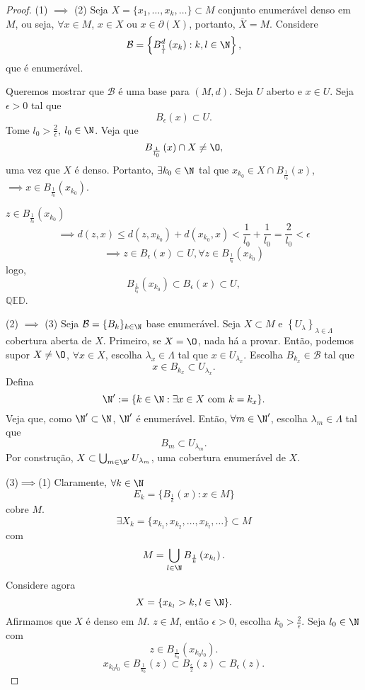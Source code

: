 \begin{proof}
    (1) $\implies$ (2)
    Seja $X=\{x_1,\ldots,x_k,\ldots\} \subset M$ conjunto enumerável denso em $M$, ou seja, $\forall x \in M$, $x\in X$ ou $x \in \partial\left( X \right)$, portanto, $\overline{X}=M$. Considere \[
    \mathcal{B} = \left\{ B_{\frac{1}{l}}^{d}\left( x_k \right) : k,l\in \N \right\} 
    ,\] que é enumerável.

    Queremos mostrar que $\mathcal{B}$ é uma base para $\left( M,d \right) $. Seja $U$ aberto e $x\in U$. Seja $\epsilon>0$ tal que \[
    B_{\epsilon}\left( x \right) \subset U
    .\] Tome $l_0>\frac{2}{\epsilon}$, $l_0\in \N$. Veja que \[
    B_{\frac{1}{l_0}}\left( x \right) \cap X \neq \O
    ,\] uma vez que $X$ é denso. Portanto, $\exists k_0\in \N$ tal que $x_{k_0}\in X\cap B_{\frac{1}{l_0}}\left( x \right) $, $\implies x\in B_{\frac{1}{l_0}}\left( x_{k_0} \right)$. 

    $z\in B_{\frac{1}{l_0}}\left( x_{k_0} \right) $ \[
    \implies d\left( z,x \right) \le d\left( z, x_{k_0} \right) +d\left( x_{k_0},x \right) <\frac{1}{l_0} + \frac{1}{l_0} = \frac{2}{l_0} < \epsilon
    \] \[
    \implies z\in B_{\epsilon}\left( x \right) \subset U, \forall z\in B_{\frac{1}{l_0}}\left( x_{k_{0}} \right)
    \] logo, \[
    B_{\frac{1}{l_0}}\left( x_{k_{0}} \right) \subset B_\epsilon\left( x \right) \subset U
    ,\] $\mathbb{QED}$.

    (2) $\implies$ (3)
    Seja $\mathcal{B} = \{B_k\} _{k\in \N}$ base enumerável. Seja $X\subset M$ e $\left\{ U_{\lambda} \right\} _{\lambda\in \Lambda}$ cobertura aberta de $X$. Primeiro, se $X=\O $, nada há a provar. Então, podemos supor $X\neq \O $, $\forall x\in X$, escolha $\lambda_x \in \Lambda$ tal que $x\in U_{\lambda_x}$. Escolha $B_{k_x}\in \mathcal{B}$ tal que \[
    x\in B_{k_x}\subset U_{\lambda_x}
    .\]
    Defina \[
    \N' := \{k\in \N : \exists x\in X \text{ com } k=k_x\} 
    .\] Veja que, como $\N'\subset \N$, $\N'$ é enumerável. Então, $\forall m\in \N'$, escolha $\lambda_m\in \Lambda$ tal que \[
    B_m\subset U_{\lambda_m}
    .\] Por construção, $X\subset \bigcup_{m\in \N'} U_{\lambda_m}$, uma cobertura enumerável de $X$.

    (3)$\implies$(1)
    Claramente, $\forall k\in \N$ \[
    E_k = \{B_{\frac{1}{k}}\left( x \right) : x\in M\} 
    \] cobre $M$. \[
    \exists  X_k = \{x_{k_1}, x_{k_2},\ldots,x_{k_l},\ldots\} \subset M
    \] com \[
    M = \bigcup_{l\in \N} B_{\frac{1}{k}}\left( x_{k_l} \right) 
    .\] 
    Considere agora \[
    X = \{x_{k_l} > k,l \in \N\} 
    .\] Afirmamos que $X$ é denso em $M$. $z\in M$, então $\epsilon>0$, escolha $k_0>\frac{2}{\epsilon}$. Seja $l_0\in \N$ com \[
    z\in B_{\frac{1}{k_0}}\left( x_{k_0 l_0} \right) 
    .\] \[
    x_{k_0 l_0} \in B_{\frac{1}{k_0}}\left( z \right)\subset B_{\frac{\epsilon}{2}} \left( z \right)\subset B_{\epsilon} \left( z \right) 
    .\] 
\end{proof}

